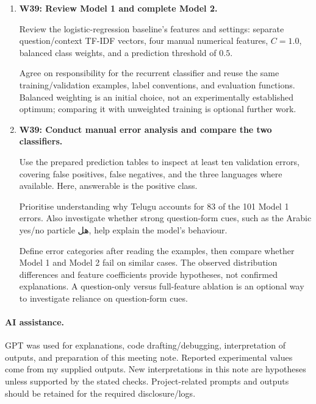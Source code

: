\documentclass[11pt,a4paper]{article}
\newcommand{\AR}[1]{{\arabicfont\beginR #1\endR}}
\begin{document}
\begin{enumerate}[leftmargin=*,itemsep=8pt]
\item \textbf{W39: Review Model 1 and complete Model 2.}

Review the logistic-regression baseline's features and settings:
separate question/context TF-IDF vectors, four manual numerical
features, $C=1.0$, balanced class weights, and a prediction
threshold of $0.5$.

Agree on responsibility for the recurrent classifier and reuse
the same training/validation examples, label conventions,
and evaluation functions. Balanced weighting is an initial
choice, not an experimentally established optimum; comparing
it with unweighted training is optional further work.

\item \textbf{W39: Conduct manual error analysis and compare
the two classifiers.}

Use the prepared prediction tables to inspect at least ten
validation errors, covering false positives, false negatives,
and the three languages where available.
Here, answerable is the positive class.

Prioritise understanding why Telugu accounts for 83 of the
101 Model 1 errors. Also investigate whether strong
question-form cues, such as the Arabic yes/no particle
\AR{هل}, help explain the model's behaviour.

Define error categories after reading the examples, then compare
whether Model 1 and Model 2 fail on similar cases.
The observed distribution differences and feature coefficients
provide hypotheses, not confirmed explanations.
A question-only versus full-feature ablation is an optional
way to investigate reliance on question-form cues.

\end{enumerate}

\paragraph{AI assistance.} GPT was used for explanations, code drafting/debugging, interpretation of outputs, and preparation of this meeting note. Reported experimental values come from my supplied outputs. New interpretations in this note are hypotheses unless supported by the stated checks. Project-related prompts and outputs should be retained for the required disclosure/logs.
\end{document}
